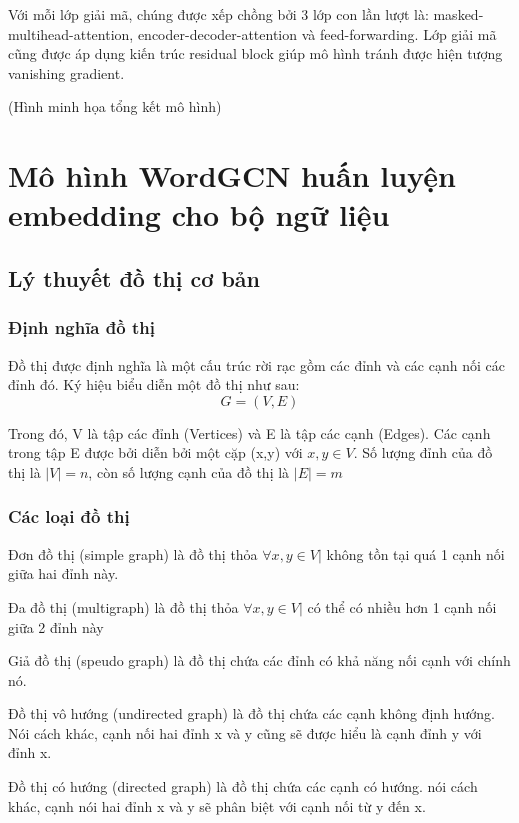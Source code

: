 Với mỗi lớp giải mã, chúng được xếp chồng bởi 3 lớp con lần lượt là: masked-multihead-attention, encoder-decoder-attention và feed-forwarding. Lớp giải mã cũng được áp dụng kiến trúc residual block giúp mô hình tránh được hiện tượng vanishing gradient.

(Hình minh họa tổng kết mô hình)


\section{Mô hình WordGCN huấn luyện embedding cho bộ ngữ liệu}

\subsection{Lý thuyết đồ thị cơ bản}

\subsubsection{Định nghĩa đồ thị}

Đồ thị được định nghĩa là một cấu trúc rời rạc gồm các đỉnh và các cạnh nối các đỉnh đó. Ký hiệu biểu diễn một đồ thị như sau:
\begin{equation*}
	G = (V,E)
\end{equation*}

Trong đó, V là tập các đỉnh (Vertices) và E là tập các cạnh (Edges). Các cạnh trong tập E được bởi diễn bởi một cặp (x,y) với $x,y \in V$. Số lượng đỉnh của đồ thị là $|V| = n$, còn số lượng cạnh của đồ thị là $|E| = m$

\subsubsection{Các loại đồ thị}
Đơn đồ thị (simple graph) là đồ thị thỏa $\forall x,y \in V | $ không tồn tại quá 1 cạnh nối giữa hai đỉnh này.

Đa đồ thị (multigraph) là đồ thị thỏa $\forall x,y \in V | $ có thể có nhiều hơn 1 cạnh nối giữa 2 đỉnh này 

Giả đồ thị (speudo graph) là đồ thị chứa các đỉnh có khả năng nối cạnh với chính nó.

Đồ thị vô hướng (undirected graph) là đồ thị chứa các cạnh không định hướng. Nói cách khác, cạnh nối hai đỉnh x và y cũng sẽ được hiểu là cạnh đỉnh y với đỉnh x.

Đồ thị có hướng (directed graph) là đồ thị chứa các cạnh có hướng. nói cách khác, cạnh nói hai đỉnh x và y sẽ phân biệt với cạnh nối từ y đến x.

